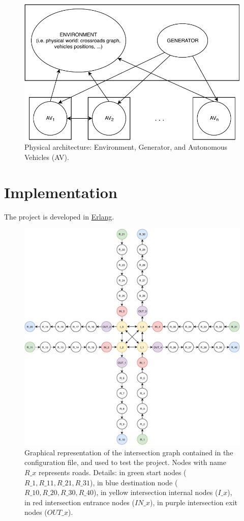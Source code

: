 \documentclass{memoir}
\begin{document}
\begin{figure}
	\centering
	\includegraphics[width=0.8\linewidth]{physical_architecture.pdf}
	\caption{Physical architecture: Environment, Generator, and Autonomous Vehicles (AV).}
	\label{fig:physical-architecture}
\end{figure}


\chapter{Implementation}
The project is developed in \href{https://www.erlang.org/}{Erlang}.

\begin{figure}
	\centering
	\includegraphics[width=\linewidth]{config_graph.pdf}
	\caption{Graphical representation of the intersection graph contained in the configuration file, and used to test the project. Nodes with name $R\_x$ represents roads. Details: in green start nodes ($R\_1, R\_11, R\_21, R\_31$), in blue destination node ($R\_10, R\_20, R\_30, R\_40$), in yellow intersection internal nodes ($I\_x$), in red intersection entrance nodes ($IN\_x$), in purple intersection exit nodes ($OUT\_x$). }
	\label{fig:config-graph}
\end{figure}
\end{document}
